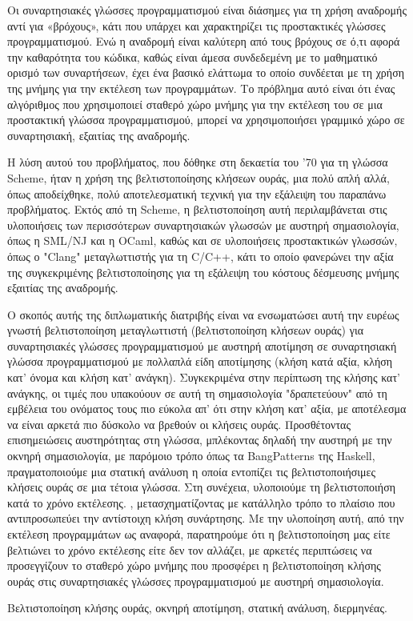 \documentclass[diploma]{softlab-thesis}
\begin{document}
\begin{abstractgr}%

Οι συναρτησιακές γλώσσες προγραμματισμού είναι διάσημες για τη χρήση αναδρομής αντί για «βρόχους», 
κάτι που υπάρχει και χαρακτηρίζει τις προστακτικές γλώσσες προγραμματισμού. Ενώ η αναδρομή είναι καλύτερη από 
τους βρόχους σε ό,τι αφορά την καθαρότητα του κώδικα, καθώς είναι άμεσα συνδεδεμένη με το μαθηματικό ορισμό
των συναρτήσεων, έχει ένα βασικό ελάττωμα το οποίο συνδέεται με τη χρήση της μνήμης για την εκτέλεση των 
προγραμμάτων. Το πρόβλημα αυτό είναι ότι ένας αλγόριθμος που χρησιμοποιεί σταθερό χώρο μνήμης για την εκτέλεση του
σε μια προστακτική γλώσσα προγραμματισμού, μπορεί να χρησιμοποιήσει γραμμικό χώρο σε συναρτησιακή, εξαιτίας 
της αναδρομής.
  

Η λύση αυτού του προβλήματος, που δόθηκε στη δεκαετία του '70 για τη γλώσσα Scheme, ήταν η χρήση της βελτιστοποίησης
κλήσεων ουράς, μια πολύ απλή αλλά, όπως αποδείχθηκε, πολύ αποτελεσματική τεχνική για την εξάλειψη του παραπάνω προβλήματος.
Εκτός από τη Scheme, η βελτιστοποίηση αυτή περιλαμβάνεται στις υλοποιήσεις των περισσότερων συναρτησιακών 
γλωσσών με αυστηρή σημασιολογία, όπως η SML/NJ και η OCaml, καθώς και σε υλοποιήσεις προστακτικών 
γλωσσών, όπως ο "Clang" μεταγλωττιστής για τη C/C++, κάτι το οποίο φανερώνει την αξία της συγκεκριμένης 
βελτιστοποίησης για τη εξάλειψη του κόστους δέσμευσης μνήμης εξαιτίας της αναδρομής. 

Ο σκοπός αυτής της διπλωματικής διατριβής είναι να ενσωματώσει αυτή την ευρέως γνωστή βελτιστοποίηση 
μεταγλωττιστή (βελτιστοποίηση κλήσεων ουράς) για συναρτησιακές γλώσσες προγραμματισμού με αυστηρή αποτίμηση σε 
συναρτησιακή γλώσσα προγραμματισμού με πολλαπλά είδη αποτίμησης (κλήση κατά αξία, κλήση κατ' όνομα και 
κλήση κατ' ανάγκη). Συγκεκριμένα στην  περίπτωση της κλήσης κατ' ανάγκης, οι τιμές που υπακούουν σε αυτή τη
σημασιολογία "δραπετεύουν" από τη εμβέλεια του ονόματος τους πιο εύκολα απ' ότι στην 
κλήση κατ' αξία, με αποτέλεσμα να είναι αρκετά πιο δύσκολο να βρεθούν οι κλήσεις ουράς.
Προσθέτοντας επισημειώσεις αυστηρότητας
στη γλώσσα, μπλέκοντας δηλαδή την αυστηρή με την οκνηρή σημασιολογία, με παρόμοιο τρόπο όπως τα 
BangPatterns της Haskell, πραγματοποιούμε μια στατική ανάλυση η οποία εντοπίζει τις βελτιστοποιήσιμες 
κλήσεις ουράς σε μια τέτοια γλώσσα. Στη συνέχεια, υλοποιούμε τη βελτιστοποιήση κατά το χρόνο εκτέλεσης.
, μετασχηματίζοντας με κατάλληλο τρόπο το πλαίσιο που αντιπροσωπεύει την αντίστοιχη 
κλήση συνάρτησης. Με την υλοποίηση αυτή, από την εκτέλεση προγραμμάτων ως αναφορά, παρατηρούμε ότι η 
βελτιστοποίηση μας είτε βελτιώνει το χρόνο εκτέλεσης είτε δεν τον αλλάζει, με αρκετές περιπτώσεις 
να προσεγγίζουν το σταθερό χώρο μνήμης που προσφέρει η βελτιστοποίηση κλήσης ουράς στις συναρτησιακές 
γλώσσες προγραμματισμού με αυστηρή σημασιολογία.


\begin{keywordsgr}
Βελτιστοποίηση κλήσης ουράς, οκνηρή αποτίμηση, στατική ανάλυση, διερμηνέας.
\end{keywordsgr}
\end{abstractgr}
\end{document}
